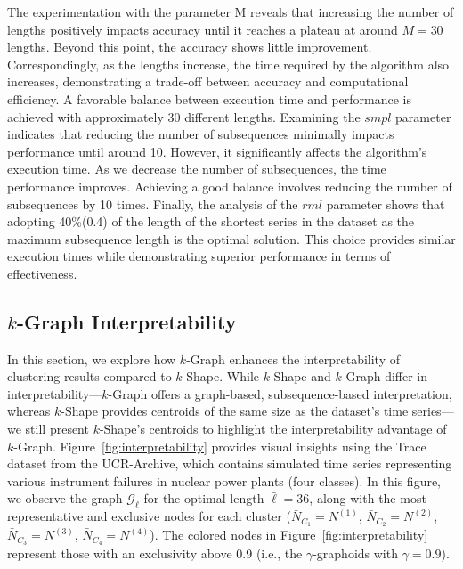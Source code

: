  The experimentation with the parameter M reveals that increasing the number of lengths positively impacts accuracy until it reaches a plateau at around $M=30$ lengths. Beyond this point, the accuracy shows little improvement. Correspondingly, as the lengths increase, the time required by the algorithm also increases, demonstrating a trade-off between accuracy and computational efficiency. A favorable balance between execution time and performance is achieved with approximately 30 different lengths. Examining the $smpl$ parameter indicates that reducing the number of subsequences minimally impacts performance until around 10. However, it significantly affects the algorithm's execution time. As we decrease the number of subsequences, the time performance improves. Achieving a good balance involves reducing the number of subsequences by 10 times. Finally, the analysis of the $rml$ parameter shows that adopting 40\%(0.4) of the length of the shortest series in the dataset as the maximum subsequence length is the optimal solution. This choice provides similar execution times while demonstrating superior performance in terms of effectiveness.


\subsection{$k$-Graph Interpretability}


 In this section, we explore how $k$-Graph enhances the interpretability of clustering results compared to $k$-Shape. While $k$-Shape and $k$-Graph differ in interpretability---$k$-Graph offers a graph-based, subsequence-based interpretation, whereas $k$-Shape provides centroids of the same size as the dataset's time series---we still present $k$-Shape's centroids to highlight the interpretability advantage of $k$-Graph. Figure~\ref{fig:interpretability} provides visual insights using the Trace dataset from the UCR-Archive, which contains simulated time series representing various instrument failures in nuclear power plants (four classes). 
In this figure, we observe the graph $\mathcal{G}_{\bar{\ell}}$ for the optimal length $\bar{\ell}=36$, along with the most representative and exclusive nodes for each cluster ($\bar{N}_{C_1}=N^{(1)}$, $\bar{N}_{C_2}=N^{(2)}$, $\bar{N}_{C_3}=N^{(3)}$, $\bar{N}_{C_4}=N^{(4)}$).
The colored nodes in Figure~\ref{fig:interpretability}  represent those with an exclusivity above 0.9 (i.e., the $\gamma$-graphoids with $\gamma=0.9$). 

